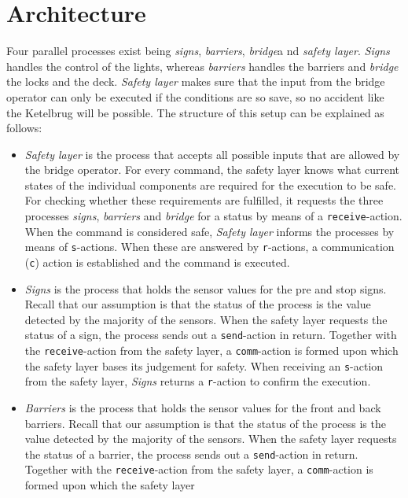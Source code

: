 \section{Architecture}
\label{sec:arch}

Four parallel processes exist being \emph{signs}, \emph{barriers},  \emph{bridge}a nd \emph{safety layer}. \emph{Signs} handles the control of the lights, whereas \emph{barriers} handles the barriers and \emph{bridge} the locks and the deck. \emph{Safety layer} makes sure that the input from the bridge operator can only be executed if the conditions are so save, so no accident like the Ketelbrug will be possible. The structure of this setup can be explained as follows:
%
\begin{itemize}
	\item \emph{Safety layer} is the process that accepts all possible inputs that are allowed by the bridge operator. For every command, the safety layer knows what current states of the individual components are required for the
	execution to be safe. For checking whether these requirements are fulfilled, it requests the three processes \emph{signs}, \emph{barriers} and \emph{bridge} for a status by means of a \texttt{receive}-action.
	When the command is considered safe, \emph{Safety layer} informs the processes by means of \texttt{s}-actions. When these are answered by \texttt{r}-actions, a communication (\texttt{c}) action is established and the command
	is executed.
	\item \emph{Signs} is the process that holds the sensor values for the pre and stop signs. Recall that our assumption is that the status of the process is the value detected by the majority of the sensors. When the safety layer
	requests the status of a sign, the process sends out a \texttt{send}-action in return. Together with the \texttt{receive}-action from the safety layer, a \texttt{comm}-action is formed upon which the safety layer bases its
	judgement for safety. When receiving an \texttt{s}-action from the safety layer, \emph{Signs} returns a \texttt{r}-action to confirm the execution.
	\item \emph{Barriers} is the process that holds the sensor values for the front and back barriers. Recall that our assumption is that the status of the process is the value detected by the majority of the sensors. When the
	safety layer requests the status of a barrier, the process sends out a \texttt{send}-action in return. Together with the \texttt{receive}-action from the safety layer, a \texttt{comm}-action is formed upon which the safety layer

\end{itemize}
